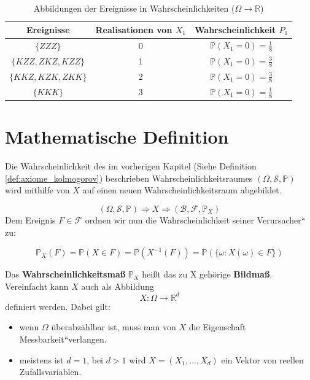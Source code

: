 {    \begin{table}
        \centering
        \begin{tabular}{ccc}
        \hline
        \textbf{Ereignisse} & \textbf{Realisationen von $X_1$}& \textbf{Wahrscheinlichkeit $P_1$}\\
        \hline
         $\{ZZZ\}$ & 0 & $\mathbb{P}(X_1=0)=\frac{1}{8}$\\
         $\{KZZ,ZKZ,KZZ\}$ & 1 & $\mathbb{P}(X_1=0)=\frac{3}{8}$\\
         $\{KKZ,KZK,ZKK\}$ & 2 & $\mathbb{P}(X_1=0)=\frac{3}{8}$\\
         $\{KKK\}$ & 3 & $\mathbb{P}(X_1=0)=\frac{1}{8}$\\
         \hline
        \end{tabular}
        \caption{Abbildungen der Ereignisse in Wahrscheinlichkeiten ($\Omega\to\mathbb R$)}\label{tab:zv_abbildungen}
    \end{table}

    \section{Mathematische Definition}

    Die Wahrscheinlichkeit des im vorherigen Kapitel (Siehe Definition \ref{def:axiome_kolmogorov}) beschrieben
    Wahrscheinlichkeitsraumes  $\left(\Omega,\mathcal S,\mathbb P\right)$ wird mithilfe von $X$ auf einen
    neuen Wahrscheinlichkeitsraum abgebildet.

    \[\left(\Omega ,\mathcal S,\mathbb P\right)\Rightarrow X\Rightarrow (\mathcal B,\mathcal F,\mathbb P_{X})\]
    Dem Ereignis $F\in \mathcal F$ ordnen wir nun die Wahrscheinlichkeit seiner {\quotedblbase}Verursacher{\textquotedblleft} zu:

    \[
    \mathbb P_{X}\left(F\right)=
    \mathbb P(X\in F)=\mathbb P\left(X^{-1}\left(F\right)\right)=
    \mathbb P\left(\{\omega:X\left(\omega \right)\in F\}\right)
    \]

    \begin{definition}
    Das \textbf{Wahrscheinlichkeitsmaß} $\mathbb P_{X}$ heißt das zu X gehörige \textbf{Bildmaß}.
    Vereinfacht kann $X$ auch als Abbildung 
    \[
    X:\Omega\rightarrow \mathbb R^{d}
    \]  
    definiert werden. Dabei gilt:

    \begin{itemize}
    \item wenn $\Omega$ überabzählbar ist, muss man von $X$ die Eigenschaft 
        \quotedblbase Messbarkeit\textquotedblleft verlangen.
    \item meistens ist $d=1$, bei $d>1$ wird $X=\left(X_{1},...,X_{d}\right)$ ein Vektor von reellen
        Zufallsvariablen.
    \end{itemize}
    \end{definition}

}
